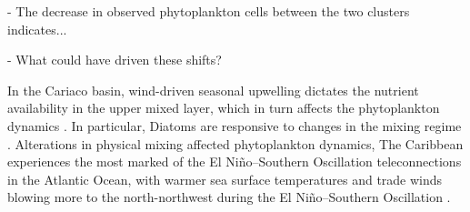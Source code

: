\documentclass[draft]{agujournal2019}
\begin{document}
- The decrease in observed phytoplankton cells between the two clusters indicates...

- What could have driven these shifts?



In the Cariaco basin, wind-driven seasonal upwelling dictates the nutrient availability in the upper mixed layer, which in turn affects the phytoplankton dynamics \cite{ptacnik_diversity_2008, bopp_response_2005}. In particular, Diatoms are responsive to changes in the mixing regime \cite{huisman_reduced_2006}.
Alterations in physical mixing affected phytoplankton dynamics,
The Caribbean experiences the most marked of the El Niño–Southern Oscillation teleconnections in the Atlantic Ocean, with warmer sea surface temperatures and trade winds blowing more to the north-northwest during the El Niño–Southern Oscillation \cite{enfield_tropical_1997}.
\end{document}
